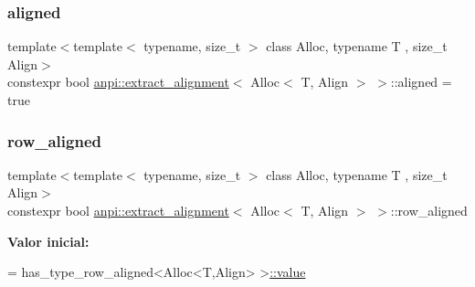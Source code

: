 \subsubsection{\texorpdfstring{aligned}{aligned}}
{\footnotesize\ttfamily template$<$template$<$ typename, size\+\_\+t $>$ class Alloc, typename T , size\+\_\+t Align$>$ \\
constexpr bool \hyperlink{structanpi_1_1extract__alignment}{anpi\+::extract\+\_\+alignment}$<$ Alloc$<$ T, Align $>$ $>$\+::aligned = true\hspace{0.3cm}{\ttfamily [static]}}

\mbox{\label{structanpi_1_1extract__alignment_3_01Alloc_3_01T_00_01Align_01_4_01_4_ac5337014dfd1a6d908109b27bf9caacb}} 
\subsubsection{\texorpdfstring{row\+\_\+aligned}{row\_aligned}}
{\footnotesize\ttfamily template$<$template$<$ typename, size\+\_\+t $>$ class Alloc, typename T , size\+\_\+t Align$>$ \\
constexpr bool \hyperlink{structanpi_1_1extract__alignment}{anpi\+::extract\+\_\+alignment}$<$ Alloc$<$ T, Align $>$ $>$\+::row\+\_\+aligned\hspace{0.3cm}{\ttfamily [static]}}

{\bfseries Valor inicial\+:}
\begin{DoxyCode}
=
      has\_type\_row\_aligned<Alloc<T,Align> >\hyperlink{structanpi_1_1extract__alignment_3_01Alloc_3_01T_00_01Align_01_4_01_4_a3bb91d789c6c831b2eae0780043c3bf8}{::value}
\end{DoxyCode}
\mbox{\label{structanpi_1_1extract__alignment_3_01Alloc_3_01T_00_01Align_01_4_01_4_a3bb91d789c6c831b2eae0780043c3bf8}} 

